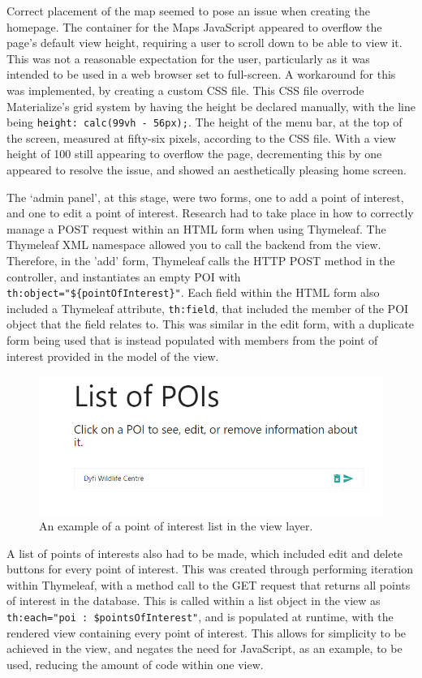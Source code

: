 Correct placement of the map seemed to pose an issue when creating the homepage. The container for the Maps JavaScript appeared to overflow the page's default view height, requiring a user to scroll down to be able to view it. This was not a reasonable expectation for the user, particularly as it was intended to be used in a web browser set to full-screen. A workaround for this was implemented, by creating a custom CSS file. This CSS file overrode Materialize's grid system by having the height be declared manually, with the line being \texttt{height: calc(99vh - 56px);}. The height of the menu bar, at the top of the screen, measured at fifty-six pixels, according to the CSS file. With a view height of 100 still appearing to overflow the page, decrementing this by one appeared to resolve the issue, and showed an aesthetically pleasing home screen.

The `admin panel', at this stage, were two forms, one to add a point of interest, and one to edit a point of interest. Research had to take place in how to correctly manage a POST request within an HTML form when using Thymeleaf. The Thymeleaf XML namespace allowed you to call the backend from the view. Therefore, in the 'add' form, Thymeleaf calls the HTTP POST method in the controller, and instantiates an empty POI with \texttt{th:object="\$\{pointOfInterest\}"}. Each field within the HTML form also included a Thymeleaf attribute, \texttt{th:field}, that included the member of the POI object that the field relates to. This was similar in the edit form, with a duplicate form being used that is instead populated with members from the point of interest provided in the model of the view.
\newpage
\begin{figure}[!ht]
	\includegraphics[scale=0.6]{diagrams/listPOI}
	\caption{An example of a point of interest list in the view layer.}
\end{figure}	


A list of points of interests also had to be made, which included edit and delete buttons for every point of interest. This was created through performing iteration within Thymeleaf, with a method call to the GET request that returns all points of interest in the database. This is called within a list object in the view as \texttt{th:each="poi : \${pointsOfInterest}"}, and is populated at runtime, with the rendered view containing every point of interest. This allows for simplicity to be achieved in the view, and negates the need for JavaScript, as an example, to be used, reducing the amount of code within one view.


